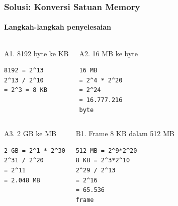\documentclass[t,aspectratio=169,xcolor=dvipsnames]{beamer}
\begin{document}
\begin{frame}[fragile]
    \frametitle{Solusi: Konversi Satuan Memory}
    \framesubtitle{Langkah-langkah penyelesaian}
    \tiny

    \begin{columns}[T]
        \begin{block}{A1. 8192 byte ke KB}
            \begin{lstlisting}[basicstyle=\ttfamily\tiny,breaklines=true]
8192 = 2^13
2^13 / 2^10
= 2^3 = 8 KB
            \end{lstlisting}
        \end{block}

        \begin{block}{A2. 16 MB ke byte}
            \begin{lstlisting}[basicstyle=\ttfamily\tiny,breaklines=true]
16 MB
= 2^4 * 2^20
= 2^24
= 16.777.216
byte
            \end{lstlisting}
        \end{block}
    \end{columns}

    \vspace{0.1cm}
    \begin{columns}[T]
        \begin{block}{A3. 2 GB ke MB}
            \begin{lstlisting}[basicstyle=\ttfamily\tiny,breaklines=true]
2 GB = 2^1 * 2^30
2^31 / 2^20
= 2^11
= 2.048 MB
            \end{lstlisting}
        \end{block}

        \begin{block}{B1. Frame 8 KB dalam 512 MB}
            \begin{lstlisting}[basicstyle=\ttfamily\tiny,breaklines=true]
512 MB = 2^9*2^20
8 KB = 2^3*2^10
2^29 / 2^13
= 2^16
= 65.536
frame
            \end{lstlisting}
        \end{block}
    \end{columns}
\end{frame}
\end{document}
